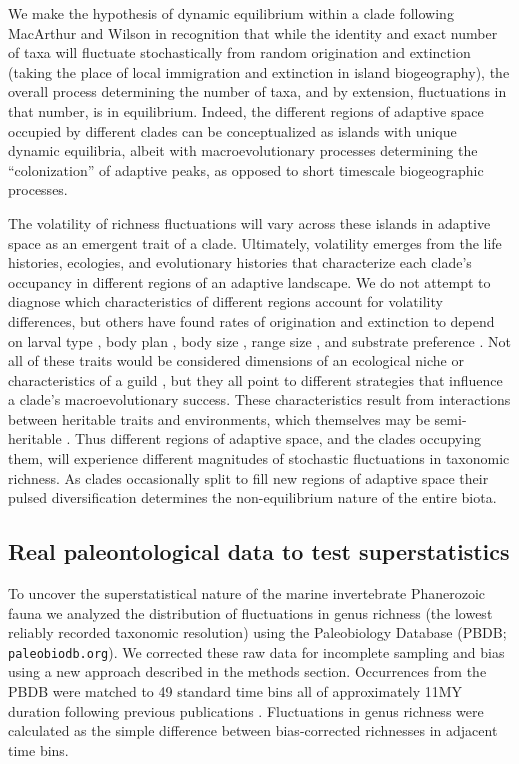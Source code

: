 \documentclass[12pt]{article}
\let\citep=\cite
\begin{document}
We make the hypothesis of dynamic equilibrium within a clade following
MacArthur and Wilson \citep{macWilson} in recognition that while the
identity and exact number of taxa will fluctuate stochastically from
random origination and extinction (taking the place of local
immigration and extinction in island biogeography), the overall
process determining the number of taxa, and by extension, fluctuations
in that number, is in equilibrium. Indeed, the different regions of
adaptive space occupied by different clades can be conceptualized as
islands with unique dynamic equilibria, albeit with macroevolutionary
processes determining the ``colonization'' of adaptive peaks, as
opposed to short timescale biogeographic processes.

The volatility of richness fluctuations will vary across these islands
in adaptive space as an emergent trait of a clade. Ultimately,
volatility emerges from the life histories, ecologies, and
evolutionary histories that characterize each clade's occupancy in
different regions of an adaptive landscape. We do not attempt to
diagnose which characteristics of different regions account for
volatility differences, but others have found rates of origination and
extinction to depend on larval type \citep{jablonski2008}, body plan
\citep{erwin2012}, body size \citep{harnik2011}, range size
\citep{harnik2011, foote2008paleobiol}, and substrate preference
\citep{hopkins2014}. Not all of these traits would be considered
dimensions of an ecological niche or characteristics of a guild
\citep{bambach1983, bambach2007, bush2007}, but they all point to
different strategies that influence a clade's macroevolutionary
success. These characteristics result from interactions between
heritable traits and environments, which themselves may be
semi-heritable \citep{nicheCons}. Thus different regions of adaptive
space, and the clades occupying them, will experience different
magnitudes of stochastic fluctuations in taxonomic richness. As clades
occasionally split to fill new regions of adaptive space their pulsed
diversification determines the non-equilibrium nature of the entire
biota.


\subsection{Real paleontological data to test superstatistics}

To uncover the superstatistical nature of the marine invertebrate
Phanerozoic fauna we analyzed the distribution of fluctuations in
genus richness (the lowest reliably recorded taxonomic resolution)
using the Paleobiology Database (PBDB; {\tt paleobiodb.org}). We
corrected these raw data for incomplete sampling and bias using a new
approach described in the methods section. Occurrences from the PBDB
were matched to 49 standard time bins all of approximately 11MY
duration following previous publications \citep{alroy08,
  alroy2010}. Fluctuations in genus richness were calculated as the
simple difference between bias-corrected richnesses in adjacent
time bins.
\end{document}
